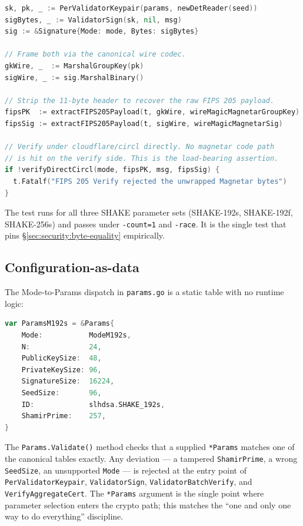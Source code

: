 \begin{lstlisting}[language=go,caption={Excerpt: \texttt{TestMagnetar\_Wire\_FIPS205Verifiable} core assertions.}]
sk, pk, _ := PerValidatorKeypair(params, newDetReader(seed))
sigBytes, _ := ValidatorSign(sk, nil, msg)
sig := &Signature{Mode: mode, Bytes: sigBytes}

// Frame both via the canonical wire codec.
gkWire, _  := MarshalGroupKey(pk)
sigWire, _ := sig.MarshalBinary()

// Strip the 11-byte header to recover the raw FIPS 205 payload.
fipsPK  := extractFIPS205Payload(t, gkWire, wireMagicMagnetarGroupKey)
fipsSig := extractFIPS205Payload(t, sigWire, wireMagicMagnetarSig)

// Verify under cloudflare/circl directly. No magnetar code path
// is hit on the verify side. This is the load-bearing assertion.
if !verifyDirectCircl(mode, fipsPK, msg, fipsSig) {
  t.Fatalf("FIPS 205 Verify rejected the unwrapped Magnetar bytes")
}
\end{lstlisting}

The test runs for all three SHAKE parameter sets (SHAKE-192s,
SHAKE-192f, SHAKE-256s) and passes under \texttt{-count=1} and
\texttt{-race}. It is the single test that pins
\S\ref{sec:security:byte-equality} empirically.

\subsection{Configuration-as-data}
\label{sec:impl:config}

The Mode-to-Params dispatch in \texttt{params.go} is a static table
with no runtime logic:
\begin{lstlisting}[language=go,caption={Mode dispatch in \texttt{params.go}.}]
var ParamsM192s = &Params{
    Mode:           ModeM192s,
    N:              24,
    PublicKeySize:  48,
    PrivateKeySize: 96,
    SignatureSize:  16224,
    SeedSize:       96,
    ID:             slhdsa.SHAKE_192s,
    ShamirPrime:    257,
}
\end{lstlisting}

The \texttt{Params.Validate()} method checks that a supplied
\texttt{*Params} matches one of the canonical tables exactly. Any
deviation --- a tampered \texttt{ShamirPrime}, a wrong
\texttt{SeedSize}, an unsupported \texttt{Mode} --- is rejected at
the entry point of \texttt{PerValidatorKeypair},
\texttt{ValidatorSign}, \texttt{ValidatorBatchVerify}, and
\texttt{VerifyAggregateCert}. The \texttt{*Params} argument is the
single point where parameter selection enters the crypto path; this
matches the ``one and only one way to do everything'' discipline.


